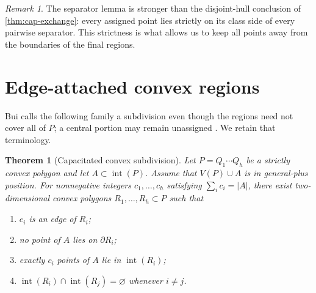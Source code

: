 \documentclass[final,5p,times,twocolumn]{elsarticle}
\newtheorem{theorem}{Theorem}[section]
\theoremstyle{definition}
\theoremstyle{remark}
\newtheorem{remark}[remark]{Remark}
\newcommand{\interior}[1]{\operatorname{int}(#1)}
\begin{document}
\begin{remark}
The separator lemma is stronger than the disjoint-hull conclusion of \cref{thm:cap-exchange}: every assigned point lies strictly on its class side of every pairwise separator. This strictness is what allows us to keep all points away from the boundaries of the final regions.
\end{remark}

\section{Edge-attached convex regions}
\label{sec:subdivision}

Bui calls the following family a subdivision even though the regions need not cover all of $P$; a central portion may remain unassigned \cite[Theorem~4.1]{Bui2025}. We retain that terminology.

\begin{theorem}[Capacitated convex subdivision]
\label{thm:subdivision}
Let $P=Q_1\cdots Q_h$ be a strictly convex polygon and let $A\subset\interior P$. Assume that $V(P)\cup A$ is in general-plus position. For nonnegative integers $c_1,\ldots,c_h$ satisfying $\sum_i c_i=|A|$, there exist two-dimensional convex polygons $R_1,\ldots,R_h\subset P$ such that
\begin{enumerate}[label=\textup{(\roman*)}]
\item $e_i$ is an edge of $R_i$;
\item no point of $A$ lies on $\partial R_i$;
\item exactly $c_i$ points of $A$ lie in $\interior{R_i}$;
\item $\interior{R_i}\cap\interior{R_j}=\varnothing$ whenever $i\neq j$.
\end{enumerate}
\end{theorem}
\end{document}
